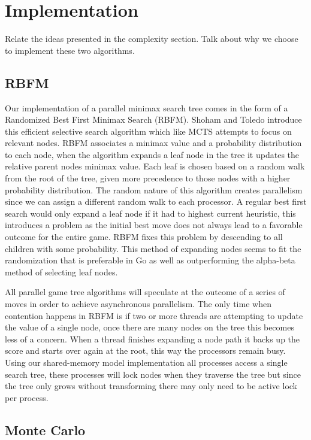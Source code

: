 \documentclass[conference]{IEEEtran}
\begin{document}
\section{Implementation}
Relate the ideas presented in the complexity section. Talk about why we choose to implement these two algorithms.

\subsection{RBFM}
Our implementation of a parallel minimax search tree comes in the form of a Randomized Best First Minimax Search (RBFM). Shoham and Toledo introduce this efficient selective search algorithm which like MCTS attempts to focus on relevant nodes. RBFM associates a minimax value and a probability distribution to each node, when the algorithm expands a leaf node in the tree it updates the relative parent nodes minimax value. Each leaf is chosen based on a random walk from the root of the tree, given more precedence to those nodes with a higher probability distribution. The random nature of this algorithm creates parallelism since we can assign a different random walk to each processor. A regular best first search would only expand a leaf node if it had to highest current heuristic, this introduces a problem as the initial best move does not always lead to a favorable outcome for the entire game. RBFM fixes this problem by descending to all children with some probability.  This method of expanding nodes seems to fit the randomization that is preferable in Go as well as outperforming the alpha-beta method of selecting leaf nodes.\par
All parallel game tree algorithms will speculate at the outcome of a series of moves in order to achieve asynchronous parallelism. The only time when contention happens in RBFM is if two or more threads are attempting to update the value of a single node, once there are many nodes on the tree this becomes less of a concern. When a thread finishes expanding a node path it backs up the score and starts over again at the root, this way the processors remain busy. Using our shared-memory model implementation all processes access a single search tree, these processes will lock nodes when they traverse the tree but since the tree only grows without transforming there may only need to be active lock per process.

\subsection{Monte Carlo}
\end{document}
